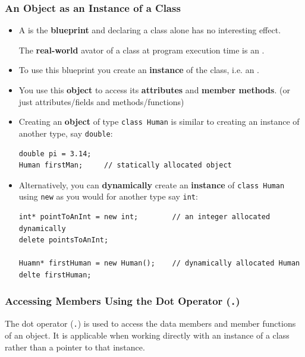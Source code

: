 \documentclass[10pt]{article}
\newcommand{\pbreak}{\vspace{30pt}}
\newcommand{\vocab}[1]{\fbox{\textbf{\textit{#1}}}}
\begin{document}
\subsubsection{An Object as an Instance of a Class}
\begin{itemize}
	\item A \vocab{class} is the \textbf{blueprint} and declaring a class alone has no interesting effect.

	The \textbf{real-world} avator of a class at program execution time is an \vocab{object}. 

\item To use this blueprint you create an \textbf{instance} of the class, i.e. an \vocab{object}.

\item You use this \textbf{object} to access its \textbf{attributes} and \textbf{member methods}. (or just attributes/fields and methods/functions)

\pbreak

\item Creating an \textbf{object} of type \verb|class Human| is similar to creating an instance of another type, say \verb|double|:

\begin{verbatim}
double pi = 3.14;
Human firstMan;		// statically allocated object
\end{verbatim}

\item Alternatively, you can \textbf{dynamically} create an \textbf{instance} of \verb|class Human| using \verb|new| as you would for another type say \verb|int|:

\begin{verbatim}
int* pointToAnInt = new int;		// an integer allocated dynamically
delete pointsToAnInt;

Huamn* firstHuman = new Human();	// dynamically allocated Human
delte firstHuman;
\end{verbatim}

\end{itemize}


\newpage
\subsubsection{Accessing Members Using the Dot Operator (\texttt{.})}

The dot operator (\texttt{.}) is used to access the data members and member functions of an object. It is applicable when working directly with an instance of a class rather than a pointer to that instance.
\end{document}
